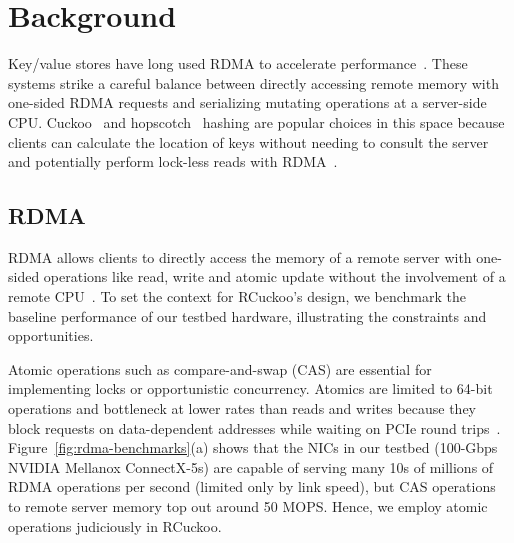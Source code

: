 
\section{Background}
\label{sec:background}



Key/value stores have long used RDMA to
accelerate
performance~\cite{farm,memc3,erpc,herd,faast,mica,pilaf,cell,storm}.
These systems strike a careful balance between directly accessing remote memory with one-sided RDMA requests and
serializing mutating operations at a server-side CPU.
Cuckoo~\cite{cuckoo} and hopscotch~\cite{hopscotch} hashing are popular choices in
this space because clients can calculate the location of
keys without needing to consult the server and potentially perform
lock-less reads with RDMA~\cite{farm,pilaf,cuckoo}.



\subsection{RDMA}

RDMA
allows
clients to directly access the memory of a remote server with
one-sided operations like read, write and atomic update without the
involvement of a remote CPU~\cite{infiniband-spec}.  To set the
context for RCuckoo's design, we benchmark the baseline performance of
our testbed hardware, illustrating the constraints and
opportunities.

Atomic operations such as compare-and-swap (CAS) are essential for
implementing locks or opportunistic concurrency. Atomics are limited
to 64-bit operations and bottleneck at lower rates than reads and
writes because they block requests on data-dependent addresses while
waiting on PCIe round trips~\cite{design-guidelines,sherman}.
Figure~\ref{fig:rdma-benchmarks}(a) shows that the NICs in our testbed
(100-Gbps NVIDIA Mellanox ConnectX-5s) are capable of serving many 10s of
millions of RDMA operations per second (limited only by link speed),
but CAS operations to remote server memory top out around 50 MOPS.  Hence, we employ atomic operations judiciously in RCuckoo.

